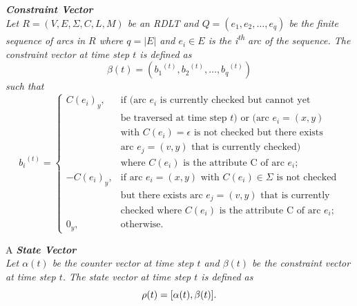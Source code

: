     \begin{defn}\label{def:constraint_vector}
    \textit{\textbf{Constraint Vector} \cite{KarenRoben2018}\\
    Let $R = (V, E, \Sigma, C, L, M)$ be an RDLT and $Q = (e_{1}, e_{2}, \ldots, e_{q})$ be the finite sequence of arcs in $R$ where $q = |E|$ and $e_{i} \in E$ is the i\textsuperscript{th} arc of the sequence. The constraint vector at time step $t$ is defined as
    \begin{displaymath}
    \beta(t) = ({b_{1}}^{(t)}, {b_{2}}^{(t)}, \ldots, {b_{q}}^{(t)})
    \end{displaymath}
    such that 
    \begin{displaymath}
    {b_{i}}^{(t)} = 
    \left\{
    \begin{array}{rl}
       C(e_{i})_{y}, &\text{if (arc $e_{i}$ is currently checked but cannot yet}\\
       &\text{be traversed at time step $t$) or (arc $e_{i} = (x,y)$}\\
       &\text{with $C(e_{i}) = \epsilon$ is not checked but there exists}\\
       &\text{arc $e_{j} = (v,y)$ that is currently checked)}\\
       &\text{where $C(e_{i})$ is the attribute C of arc $e_{i}$;}\\
       -C(e_{i})_{y}, &\text{if arc $e_{i} = (x,y)$ with $C(e_{i}) \in \Sigma$ is not checked}\\
       &\text{but there exists arc $e_{j} = (v,y)$ that is currently}\\ 
       &\text{checked where $C(e_{i})$ is the attribute C of arc $e_{i}$;}\\ 
       0_{y}, &\text{otherwise.}
    \end{array}
    \right.
    \end{displaymath}}
    \end{defn}
    
    \begin{defn}\label{def:state_vector}A
    \textit{\textbf{State Vector} \cite{KarenRoben2018}\\
    Let $\alpha(t)$ be the counter vector at time step $t$ and $\beta(t)$ be the constraint vector at time step $t$. The state vector at time step $t$ is defined as 
    \begin{displaymath}
    \rho(t) = \small[\alpha(t),\beta(t)\small].
    \end{displaymath}}
    \end{defn}
    
